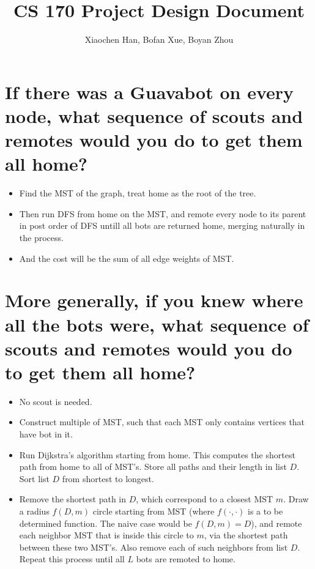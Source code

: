 \documentclass[10pt,a4paper]{article}
\author{Xiaochen Han, Bofan Xue, Boyan Zhou}
\title{CS 170 Project Design Document}
\begin{document}
\maketitle

\section{If there was a Guavabot on every node, 
what sequence of scouts and remotes would you do to get them all home?}

\begin{itemize}
\item Find the MST of the graph, treat home as the root of the tree.
\item Then run DFS from home on the MST, and remote every node to its 
parent in post order of DFS untill all bots are returned home, merging naturally in the process.
\item And the cost will be the sum of all edge weights of MST.
\end{itemize}


\newpage
\section{More generally, if you knew where all the bots were, what sequence of scouts and remotes would you do to get them all home?}
\begin{itemize}
\item No scout is needed. 
\item Construct multiple of MST, such that each MST only contains vertices that have bot in it. 
\item Run Dijkstra's algorithm starting from home. This computes the shortest path from home to all of MST's. Store all paths and their length in list $D$. Sort list $D$ from shortest to longest.
\item Remove the shortest path in $D$, which correspond to a closest MST $m$. Draw a radius $f(D, m)$ circle starting from MST (where $f(\cdot, \cdot)$ is a to be determined function. The naive case would be $f(D, m) = D$), 
and remote each neighbor MST that is inside this circle to $m$, via the shortest path between these two MST's. Also remove each of such neighbors from list $D$. Repeat this process until all $L$ bots are remoted to home.
\end{itemize}


\newpage
\end{document}
